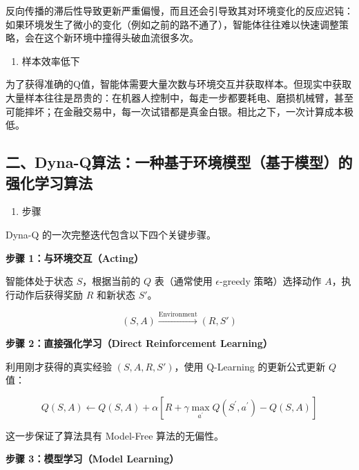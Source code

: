 反向传播的滞后性导致更新严重偏慢，而且还会引导致其对环境变化的反应迟钝：如果环境发生了微小的变化（例如之前的路不通了），智能体往往难以快速调整策略，会在这个新环境中撞得头破血流很多次。

\begin{enumerate}
\def\labelenumi{\arabic{enumi}.}
\setcounter{enumi}{1}
\tightlist
\item
  样本效率低下
\end{enumerate}

为了获得准确的Q值，智能体需要大量次数与环境交互并获取样本。但现实中获取大量样本往往是昂贵的：在机器人控制中，每走一步都要耗电、磨损机械臂，甚至可能摔坏；在金融交易中，每一次试错都是真金白银。相比之下，一次计算成本极低。

\hypertarget{ux4e8cdyna-qux7b97ux6cd5ux4e00ux79cdux57faux4e8eux73afux5883ux6a21ux578bux57faux4e8eux6a21ux578bux7684ux5f3aux5316ux5b66ux4e60ux7b97ux6cd5}{%
\subsection{二、Dyna-Q算法：一种基于环境模型（基于模型）的强化学习算法}\label{ux4e8cdyna-qux7b97ux6cd5ux4e00ux79cdux57faux4e8eux73afux5883ux6a21ux578bux57faux4e8eux6a21ux578bux7684ux5f3aux5316ux5b66ux4e60ux7b97ux6cd5}}

\begin{enumerate}
\def\labelenumi{\arabic{enumi}.}
\tightlist
\item
  步骤
\end{enumerate}

Dyna-Q 的一次完整迭代包含以下四个关键步骤。

\textbf{步骤 1：与环境交互（Acting）}

智能体处于状态 \(S\)，根据当前的 \(Q\) 表（通常使用 \(\epsilon\)-greedy 策略）选择动作 \(A\)，执行动作后获得奖励 \(R\) 和新状态 \(S'\)。

\[
(S,A)\xrightarrow{\text{Environment}}(R,S')
\]

\textbf{步骤 2：直接强化学习（Direct Reinforcement Learning）}

利用刚才获得的真实经验 \((S,A,R,S')\)，使用 Q-Learning 的更新公式更新 \(Q\) 值：

\[
Q(S,A)\leftarrow Q(S,A)+\alpha[R+\gamma\max_{a^{\prime}}Q(S^{\prime},a^{\prime})-Q(S,A)]
\]

这一步保证了算法具有 Model-Free 算法的无偏性。

\textbf{步骤 3：模型学习（Model Learning）}

